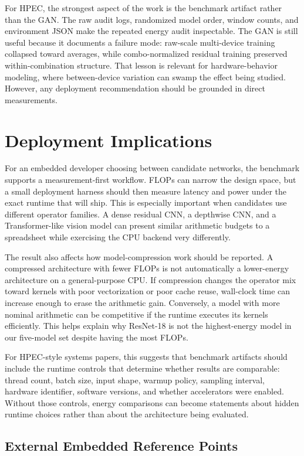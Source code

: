 \documentclass[conference]{IEEEtran}
\begin{document}
For HPEC, the strongest aspect of the work is the benchmark artifact rather
than the GAN. The raw audit logs, randomized model order, window counts, and
environment JSON make the repeated energy audit inspectable. The GAN is still
useful because it documents a failure mode: raw-scale multi-device training
collapsed toward averages, while combo-normalized residual training preserved
within-combination structure. That lesson is relevant for hardware-behavior
modeling, where between-device variation can swamp the effect being studied.
However, any deployment recommendation should be grounded in direct
measurements.

\section{Deployment Implications}

For an embedded developer choosing between candidate networks, the benchmark
supports a measurement-first workflow. FLOPs can narrow the design space, but a
small deployment harness should then measure latency and power under the exact
runtime that will ship. This is especially important when candidates use
different operator families. A dense residual CNN, a depthwise CNN, and a
Transformer-like vision model can present similar arithmetic budgets to a
spreadsheet while exercising the CPU backend very differently.

The result also affects how model-compression work should be reported. A
compressed architecture with fewer FLOPs is not automatically a lower-energy
architecture on a general-purpose CPU. If compression changes the operator mix
toward kernels with poor vectorization or poor cache reuse, wall-clock time can
increase enough to erase the arithmetic gain. Conversely, a model with more
nominal arithmetic can be competitive if the runtime executes its kernels
efficiently. This helps explain why ResNet-18 is not the highest-energy model
in our five-model set despite having the most FLOPs.

For HPEC-style systems papers, this suggests that benchmark artifacts should
include the runtime controls that determine whether results are comparable:
thread count, batch size, input shape, warmup policy, sampling interval,
hardware identifier, software versions, and whether accelerators were enabled.
Without those controls, energy comparisons can become statements about hidden
runtime choices rather than about the architecture being evaluated.

\subsection{External Embedded Reference Points}
\end{document}
